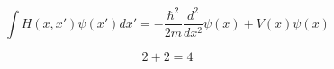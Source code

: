 \documentclass{article}
\begin{document}

{\large
\begin{displaymath}
\int H(x,x')\psi(x')dx' = -\frac{\hbar^2}{2m}\frac{d^2}{dx^2}
                          \psi(x)+V(x)\psi(x)
\end{displaymath}

\begin{equation}
2 + 2 = 4
\end{equation}

}
\end{document}
